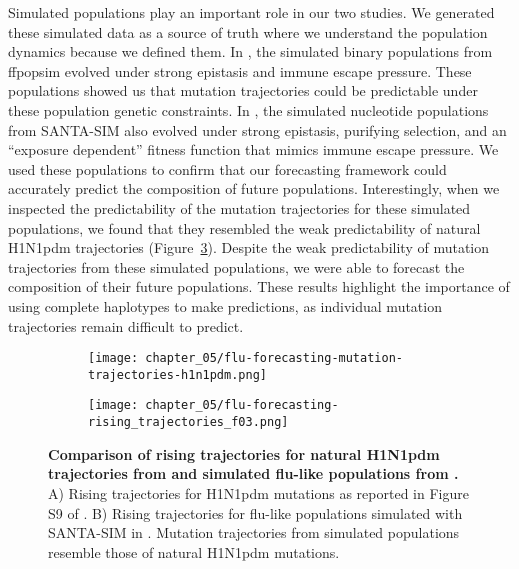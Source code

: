 Simulated populations play an important role in our two studies.
We generated these simulated data as a source of truth where we understand the population dynamics because we defined them.
In \citet{Barrat-Charlaix2020}, the simulated binary populations from ffpopsim \citep{Zanini2012} evolved under strong epistasis and immune escape pressure.
These populations showed us that mutation trajectories could be predictable under these population genetic constraints.
In \citet{Huddleston2020}, the simulated nucleotide populations from SANTA-SIM \citep{Jariani2019} also evolved under strong epistasis, purifying selection, and an ``exposure dependent'' fitness function that mimics immune escape pressure.
We used these populations to confirm that our forecasting framework could accurately predict the composition of future populations.
Interestingly, when we inspected the predictability of the mutation trajectories for these simulated populations, we found that they resembled the weak predictability of natural H1N1pdm trajectories (Figure~\ref{fig:mutation-trajectories-comparison}).
Despite the weak predictability of mutation trajectories from these simulated populations, we were able to forecast the composition of their future populations.
These results highlight the importance of using complete haplotypes to make predictions, as individual mutation trajectories remain difficult to predict.

\begin{figure}
  \begin{subfigure}[b]{0.5\textwidth}
    \centering
    \texttt{[image: chapter\_05/flu-forecasting-mutation-trajectories-h1n1pdm.png]}
    \label{fig:mutation-trajectories-h1n1pdm}
  \end{subfigure}
  \hfill
  \begin{subfigure}[b]{0.4\textwidth}
    \centering
    \texttt{[image: chapter\_05/flu-forecasting-rising\_trajectories\_f03.png]}
    \label{fig:mutation-trajectories-simulated}
  \end{subfigure}

  \caption[{Comparison of rising trajectories for natural H1N1pdm trajectories from \citet{Barrat-Charlaix2020} and simulated flu-like populations from \citet{Huddleston2020}.}]{{\bf Comparison of rising trajectories for natural H1N1pdm trajectories from \citet{Barrat-Charlaix2020} and simulated flu-like populations from \citet{Huddleston2020}.}
    A) Rising trajectories for H1N1pdm mutations as reported in Figure S9 of \citet{Barrat-Charlaix2020}.
    B) Rising trajectories for flu-like populations simulated with SANTA-SIM in \citet{Huddleston2020}.
    Mutation trajectories from simulated populations resemble those of natural H1N1pdm mutations.\label{fig:mutation-trajectories-comparison}
  }
\end{figure}


